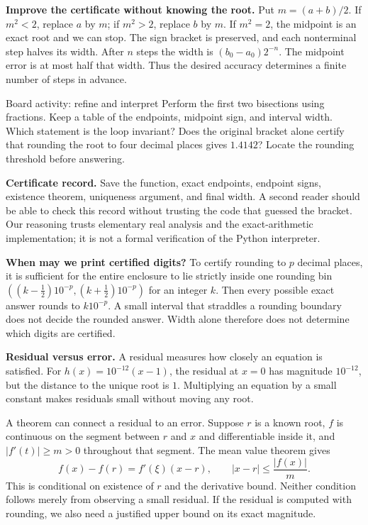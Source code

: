 \textbf{Improve the certificate without knowing the root.} Put $m=(a+b)/2$.
If $m^2<2$, replace $a$ by $m$; if $m^2>2$, replace $b$ by $m$. If $m^2=2$,
the midpoint is an exact root and we can stop. The sign bracket is preserved,
and each nonterminal step halves its width. After $n$ steps the width is
$(b_0-a_0)2^{-n}$. The midpoint error is at most half that width. Thus the desired
accuracy determines a finite number of steps in advance.

\begin{question}{Board activity: refine and interpret}
Perform the first two bisections using fractions. Keep a table of the endpoints,
midpoint sign, and interval width. Which statement is the loop invariant?
Does the original bracket alone certify that rounding the root to four decimal
places gives $1.4142$? Locate the rounding threshold before answering.
\end{question}
\textbf{Certificate record.} Save the function, exact endpoints, endpoint signs,
existence theorem, uniqueness argument, and final width. A second reader should
be able to check this record without trusting the code that guessed the bracket.
Our reasoning trusts elementary real analysis and the exact-arithmetic implementation;
it is not a formal verification of the Python interpreter.

\textbf{When may we print certified digits?} To certify rounding to $p$ decimal
places, it is sufficient for the entire enclosure to lie strictly inside one
rounding bin
$((k-\tfrac12)10^{-p},(k+\tfrac12)10^{-p})$ for an integer $k$.
Then every possible exact answer rounds to $k10^{-p}$. A small interval that
straddles a rounding boundary does not decide the rounded answer. Width alone
therefore does not determine which digits are certified.

\newpage
{}
\textbf{Residual versus error.} A residual measures how closely an equation is
satisfied. For $h(x)=10^{-12}(x-1)$, the residual at $x=0$ has magnitude $10^{-12}$,
but the distance to the unique root is $1$. Multiplying an equation by a small
constant makes residuals small without moving any root.

A theorem can connect a residual to an error. Suppose $r$ is a known root,
$f$ is continuous on the segment between $r$ and $x$ and differentiable inside it,
and $|f'(t)|\ge m>0$ throughout that segment. The mean value theorem gives
\[
 f(x)-f(r)=f'(\xi)(x-r),\qquad
 |x-r|\le\frac{|f(x)|}{m}.
\]
This is conditional on existence of $r$ and the derivative bound. Neither condition
follows merely from observing a small residual. If the residual is computed with
rounding, we also need a justified upper bound on its exact magnitude.

